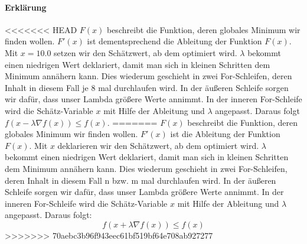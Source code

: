 \paragraph{Erklärung}
<<<<<<< HEAD
$F(x)$ beschreibt die Funktion, deren globales Minimum wir finden wollen. $F'(x)$ ist dementsprechend die Ableitung der Funktion $F(x)$. Mit $x=10.0$ setzen wir den Schätzwert, ab dem optimiert wird. $\lambda$ bekommt einen niedrigen Wert deklariert, damit man sich in kleinen Schritten dem Minimum annähern kann. Dies wiederum geschieht in zwei For-Schleifen, deren Inhalt in diesem Fall je 8 mal durchlaufen wird. In der äußeren Schleife sorgen wir dafür, dass unser Lambda größere Werte annimmt. In der inneren For-Schleife wird die Schätz-Variable $x$ mit Hilfe der Ableitung und $\lambda$ angepasst. Daraus folgt
 $f(x-\lambda \nabla f(x)) \leq f(x)$.
=======
$F(x)$ beschreibt die Funktion, deren globales Minimum wir finden wollen. $F'(x)$ ist die Ableitung der Funktion $F(x)$. Mit $x$ deklarieren wir den Schätzwert, ab dem optimiert wird. $\lambda$ bekommt einen niedrigen Wert deklariert, damit man sich in kleinen Schritten dem Minimum annähern kann. Dies wiederum geschieht in zwei For-Schleifen, deren Inhalt in diesem Fall n bzw. m mal durchlaufen wird. In der äußeren Schleife sorgen wir dafür, dass unser Lambda größere Werte annimmt. In der inneren For-Schleife wird die Schätz-Variable $x$ mit Hilfe der Ableitung und $\lambda$ angepasst. Daraus folgt:
\begin{equation*}
 f(x+\lambda \nabla f(x)) \leq f(x)
 \end{equation*}
>>>>>>> 70aebc3b96f943eec61bf519bf64e708ab927277

